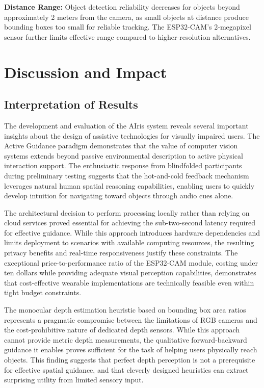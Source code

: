 \documentclass[12pt,a4paper]{report}
\begin{document}
\textbf{Distance Range:} Object detection reliability decreases for objects beyond approximately 2 meters from the camera, as small objects at distance produce bounding boxes too small for reliable tracking. The ESP32-CAM's 2-megapixel sensor further limits effective range compared to higher-resolution alternatives.


\chapter{Discussion and Impact}

\section{Interpretation of Results}

The development and evaluation of the AIris system reveals several important insights about the design of assistive technologies for visually impaired users. The Active Guidance paradigm demonstrates that the value of computer vision systems extends beyond passive environmental description to active physical interaction support. The enthusiastic response from blindfolded participants during preliminary testing suggests that the hot-and-cold feedback mechanism leverages natural human spatial reasoning capabilities, enabling users to quickly develop intuition for navigating toward objects through audio cues alone.

The architectural decision to perform processing locally rather than relying on cloud services proved essential for achieving the sub-two-second latency required for effective guidance. While this approach introduces hardware dependencies and limits deployment to scenarios with available computing resources, the resulting privacy benefits and real-time responsiveness justify these constraints. The exceptional price-to-performance ratio of the ESP32-CAM module, costing under ten dollars while providing adequate visual perception capabilities, demonstrates that cost-effective wearable implementations are technically feasible even within tight budget constraints.

The monocular depth estimation heuristic based on bounding box area ratios represents a pragmatic compromise between the limitations of RGB cameras and the cost-prohibitive nature of dedicated depth sensors. While this approach cannot provide metric depth measurements, the qualitative forward-backward guidance it enables proves sufficient for the task of helping users physically reach objects. This finding suggests that perfect depth perception is not a prerequisite for effective spatial guidance, and that cleverly designed heuristics can extract surprising utility from limited sensory input.
\end{document}
